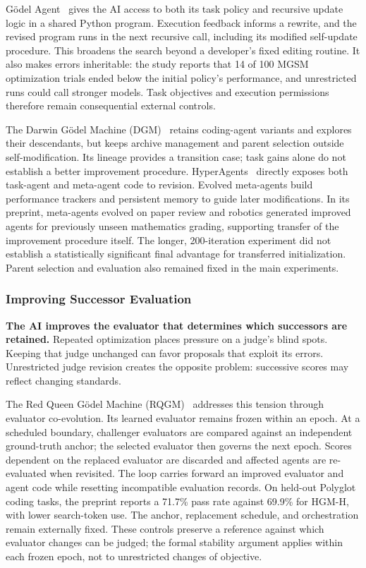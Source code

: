 G\"odel Agent~\cite{yin2025godelagent} gives the AI access to both its task policy and recursive update logic in a shared Python program. Execution feedback informs a rewrite, and the revised program runs in the next recursive call, including its modified self-update procedure. This broadens the search beyond a developer's fixed editing routine. It also makes errors inheritable: the study reports that 14 of 100 MGSM optimization trials ended below the initial policy's performance, and unrestricted runs could call stronger models. Task objectives and execution permissions therefore remain consequential external controls.

The Darwin G\"odel Machine (DGM)~\cite{zhang2026dgm} retains coding-agent variants and explores their descendants, but keeps archive management and parent selection outside self-modification. Its lineage provides a transition case; task gains alone do not establish a better improvement procedure. HyperAgents~\cite{zhang2026hyperagents} directly exposes both task-agent and meta-agent code to revision. Evolved meta-agents build performance trackers and persistent memory to guide later modifications. In its preprint, meta-agents evolved on paper review and robotics generated improved agents for previously unseen mathematics grading, supporting transfer of the improvement procedure itself. The longer, 200-iteration experiment did not establish a statistically significant final advantage for transferred initialization. Parent selection and evaluation also remained fixed in the main experiments.

\subsubsection{Improving Successor Evaluation}
\noindent\textbf{The AI improves the evaluator that determines which successors are retained.} Repeated optimization places pressure on a judge's blind spots. Keeping that judge unchanged can favor proposals that exploit its errors. Unrestricted judge revision creates the opposite problem: successive scores may reflect changing standards.

The Red Queen G\"odel Machine (RQGM)~\cite{iacob2026redqueen} addresses this tension through evaluator co-evolution. Its learned evaluator remains frozen within an epoch. At a scheduled boundary, challenger evaluators are compared against an independent ground-truth anchor; the selected evaluator then governs the next epoch. Scores dependent on the replaced evaluator are discarded and affected agents are re-evaluated when revisited. The loop carries forward an improved evaluator and agent code while resetting incompatible evaluation records. On held-out Polyglot coding tasks, the preprint reports a 71.7\% pass rate against 69.9\% for HGM-H, with lower search-token use. The anchor, replacement schedule, and orchestration remain externally fixed. These controls preserve a reference against which evaluator changes can be judged; the formal stability argument applies within each frozen epoch, not to unrestricted changes of objective.

